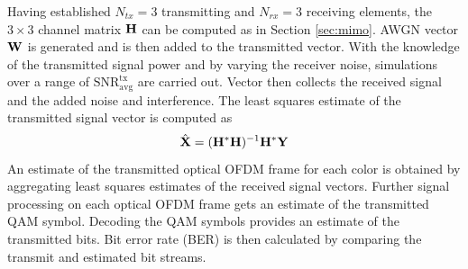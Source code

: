 Having established $N_{tx} = 3$ transmitting and $N_{rx} = 3$ receiving elements, the $3\times 3$ channel matrix ${\bf{H}}$ can be computed as in Section \ref{sec:mimo}. AWGN vector ${\bf{W}}$ is generated and is then added to the transmitted vector. With the knowledge of the transmitted signal power and by varying the receiver noise, simulations over a range of $\text{SNR}^{\text{tx}}_{\text{avg}}$ are carried out. Vector  then collects the received signal and the added noise and interference. The least squares estimate of the transmitted signal vector is computed as
\begin{equation}
	\label{eqXhat}
	\hat{\vm{X}} = (\vm{H}^{*}\vm{H})^{-1}\vm{H}^{*}\vm{Y}
\end{equation}
An estimate of the transmitted optical OFDM frame for each color is obtained by aggregating least squares estimates of the received signal vectors. Further signal processing on each optical OFDM frame gets an estimate of the transmitted QAM symbol. Decoding the QAM symbols provides an estimate of the transmitted bits. Bit error rate (BER) is then calculated by comparing the transmit and estimated bit streams.

